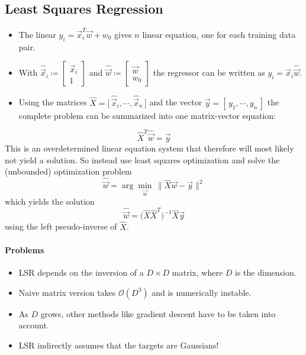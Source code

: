 		\subsection{Least Squares Regression}
			\begin{itemize}
				\item The linear \( y_i = \vec{x}_i^T \vec{w} + w_0 \) gives \(n\) linear equation, one for each training data pair.
				\item With \( \hat{\vec{x}}_i \coloneqq \begin{bmatrix} \vec{x}_i \\ 1 \end{bmatrix} \) and \( \hat{\vec{w}} \coloneqq \begin{bmatrix} \vec{w} \\ w_0 \end{bmatrix} \) the regressor can be written as \( y_i = \hat{\vec{x}}_i \hat{\vec{w}} \).
				\item Using the matrices \( \hat{X} = \big[\, \hat{\vec{x}}_i, \cdots, \hat{\vec{x}}_n \,\big] \) and the vector \( \vec{y} = [\, y_1, \cdots, y_n \,] \) the complete problem can be summarized into one matrix-vector equation:
			\end{itemize}
			\begin{equation}
				\hat{X}^T \hat{\vec{w}} = \vec{y}
			\end{equation}
			This is an overdetermined linear equation system that therefore will most likely not yield a solution. So instead use least squares optimization and solve the (unbounded) optimization problem
			\begin{equation}
				\hat{\vec{w}} = \arg\min\limits_{\vec{w}} \, \big\lVert \hat{X} \vec{w} - \vec{y} \big\rVert^2
			\end{equation}
			which yields the solution
			\begin{equation}
				\hat{\vec{w}} = \Big( \hat{X} \hat{X}^T \Big)^{-1} \hat{X} \vec{y}
			\end{equation}
			using the left pseudo-inverse of \(\hat{X}\).

			\paragraph{Problems}
				\begin{itemize}
					\item LSR depends on the inversion of a \( D \times D \) matrix, where \(D\) is the dimension.
					\item Naive matrix version takes \( \mathcal{O}(D^3) \) and is numerically instable.
					\item As \(D\) grows, other methods like gradient descent have to be taken into account.
					\item LSR indirectly assumes that the targets are Gaussians!
				\end{itemize}

